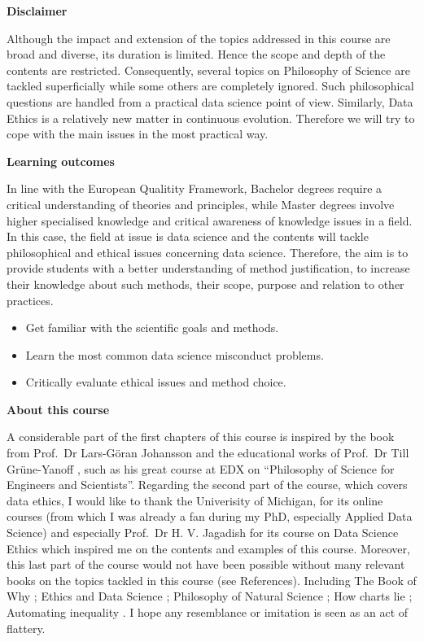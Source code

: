 \documentclass[
]{book}
\providecommand{\tightlist}{%
  \setlength{\itemsep}{0pt}\setlength{\parskip}{0pt}}
\begin{document}
\textbf{Disclaimer}

Although the impact and extension of the topics addressed in this course are broad and diverse, its duration is limited. Hence the scope and depth of the contents are restricted. Consequently, several topics on Philosophy of Science are tackled superficially while some others are completely ignored. Such philosophical questions are handled from a practical data science point of view. Similarly, Data Ethics is a relatively new matter in continuous evolution. Therefore we will try to cope with the main issues in the most practical way.

\textbf{Learning outcomes}

In line with the European Qualitity Framework, Bachelor degrees require a critical understanding of theories and principles, while Master degrees involve higher specialised knowledge and critical awareness of knowledge issues in a field. In this case, the field at issue is data science and the contents will tackle philosophical and ethical issues concerning data science. Therefore, the aim is to provide students with a better understanding of method justification, to increase their knowledge about such methods, their scope, purpose and relation to other practices.

\begin{itemize}
\tightlist
\item
  Get familiar with the scientific goals and methods.
\item
  Learn the most common data science misconduct problems.
\item
  Critically evaluate ethical issues and method choice.
\end{itemize}

\textbf{About this course}

A considerable part of the first chapters of this course is inspired by the book from Prof.~Dr Lars-Göran Johansson \citep{johansson2016philosophy} and the educational works of Prof.~Dr Till Grüne-Yanoff \citep{grune2014teaching}, such as his great course at EDX on ``Philosophy of Science for Engineers and Scientists''. Regarding the second part of the course, which covers data ethics, I would like to thank the Univerisity of Michigan, for its online courses (from which I was already a fan during my PhD, especially Applied Data Science) and especially Prof.~Dr H. V. Jagadish for its course on Data Science Ethics which inspired me on the contents and examples of this course. Moreover, this last part of the course would not have been possible without many relevant books on the topics tackled in this course (see References). Including The Book of Why \citep{book-of-why}; Ethics and Data Science \citep{loukides2018ethics}; Philosophy of Natural Science \citep{hempel-pos}; How charts lie \citep{cairo2019charts}; Automating inequality \citep{eubanks2018automating}. I hope any resemblance or imitation is seen as an act of flattery.
\end{document}
